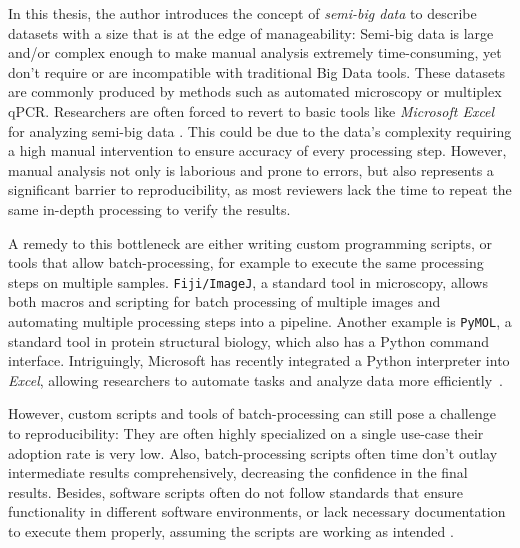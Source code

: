 In this thesis, the author introduces the concept of \emph{semi-big data} to
describe datasets with a size that is at the edge of manageability: Semi-big
data is large and/or complex enough to make manual analysis extremely
time-consuming, yet don't require or are incompatible with traditional Big Data
tools. These datasets are commonly produced by methods such as automated
microscopy or multiplex qPCR. Researchers are often forced to revert to basic
tools like \textit{Microsoft Excel} for analyzing semi-big data
\cite{incertiYouStillUsing2019a}. This could be due to the data's complexity
requiring a high manual intervention to ensure accuracy of every processing
step. However, manual analysis not only is laborious and prone to errors, but
also represents a significant barrier to reproducibility, as most reviewers lack
the time to repeat the same in-depth processing to verify the results.

A remedy to this bottleneck are either writing custom programming scripts, or
tools that allow batch-processing, for example to execute the same processing
steps on multiple samples. \texttt{Fiji/ImageJ}, a standard tool in microscopy, allows
both macros and scripting for batch processing of multiple images and
automating multiple processing steps into a pipeline. Another example is \texttt{PyMOL},
a standard tool in protein structural biology, which also has a Python command
interface. Intriguingly, Microsoft has recently integrated a Python interpreter
into \textit{Excel}, allowing researchers to automate tasks and analyze data
more efficiently~\cite{microsoftexcelAnnouncingPythonExcel2023}.

However, custom scripts and tools of batch-processing can still pose a challenge
to reproducibility: They are often highly specialized on a single use-case their
adoption rate is very low. Also, batch-processing scripts often time don't
outlay intermediate results comprehensively, decreasing the confidence in the
final results. Besides, software scripts often do not follow standards that ensure
functionality in different software environments, or lack necessary
documentation to execute them properly, assuming the scripts are working as intended
\cite{sandveTenSimpleRules2013, pengReproducibleResearchComputational2011}.





